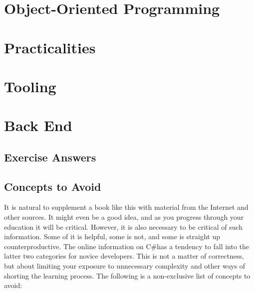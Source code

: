 \documentclass[a4paper, oneside]{memoir}
\newcommand{\csharp}{C{\lserif\#}}
\begin{document}
\part{Object-Oriented Programming}







\part{Practicalities}





\part{Tooling}






\part{Back End}
\appendix

\chapter{Exercise Answers}


\chapter{Concepts to Avoid}

It is natural to supplement a book like this with material from the Internet and other sources. It might even be a good idea, and as you progress through your education it will be critical. However, it is also necessary to be critical of such information. Some of it is helpful, some is not, and some is straight up counterproductive. The online information on \csharp has a tendency to fall into the latter two categories for novice developers. This is not a matter of correctness, but about limiting your exposure to unnecessary complexity and other ways of shorting the learning process. The following is a non-exclusive list of concepts to avoid:
\end{document}
